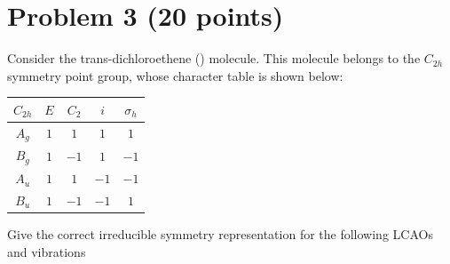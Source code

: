 \documentclass[10pt, letterpaper]{memoir}
\begin{document}
	
	\newpage
	\section*{Problem 3 (20 points)}	
	Consider the trans-dichloroethene () molecule. This molecule belongs to the $C_{2h}$ symmetry point group, whose character table is shown below:
	
	\begin{tabular}{c||c|c|c|c}
		$C_{2h}$ & $E$ & $C_2$ & $i$ & $\sigma_h$ \\ \midrule \midrule
		$A_g$ & $1$ & $1$ & $1$ & $1$ \\ \midrule
		$B_g$ & $1$ & $-1$ & $1$ & $-1$ \\ \midrule
		$A_u$ & $1$ & $1$ & $-1$ & $-1$ \\ \midrule
		$B_u$ & $1$ & $-1$ & $-1$ & $1$		
	\end{tabular}
	
	\noindent
	Give the correct irreducible symmetry representation for the following LCAOs and vibrations
	
	~
	
\end{document}
